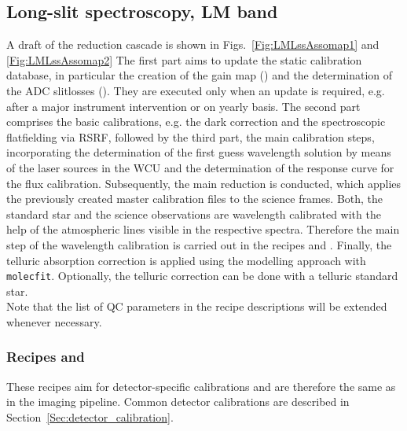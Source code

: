 \clearpage
\subsection{Long-slit spectroscopy, LM band}
\label{ssec:recipes_lss_lm}

A draft of the reduction cascade is shown in
Figs.~\ref{Fig:LMLssAssomap1} and \ref{Fig:LMLssAssomap2}%
The first part aims to update the static calibration database, in particular the creation of the gain map (\hyperref[Sec:detector_calibration]{}) and the determination of the \ac{ADC} slitlosses (\hyperref[rec:metis_lm_adc_slitloss]{}). They are executed only when an update is required, e.g. after a major instrument intervention or on yearly basis. The second part comprises the basic calibrations, e.g. the dark correction and the spectroscopic flatfielding via \ac{RSRF}, followed by the third part, the main calibration steps, incorporating the determination of the first guess wavelength solution by means of the laser sources in the \ac{WCU} and the determination of the response curve for the flux calibration. Subsequently, the main reduction is conducted, which applies the previously created master calibration files to the science frames. Both, the standard star and the science observations are wavelength calibrated with the help of the atmospheric lines visible in the respective spectra. Therefore the main step of the wavelength calibration is carried out in the recipes \hyperref[rec:metis_lm_lss_std]{} and \hyperref[rec:metis_lm_lss_sci]{}. Finally, the telluric absorption correction is applied using the modelling approach with \texttt{molecfit}. Optionally, the telluric correction can be done with a telluric standard star.\\
Note that the list of \ac{QC} parameters in the recipe descriptions will be extended whenever necessary.\\

\subsubsection{Recipes  and }
These recipes aim for detector-specific calibrations and are therefore the same as in the imaging pipeline. Common detector calibrations are described in Section~\ref{Sec:detector_calibration}.

